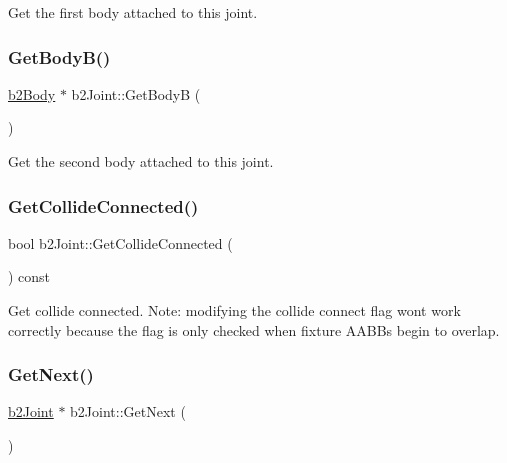 Get the first body attached to this joint. 

\mbox{\label{classb2_joint_a700b3d4c87f34f456151b9598e4641a0}} 
\subsubsection{\texorpdfstring{GetBodyB()}{GetBodyB()}}
{\footnotesize\ttfamily \mbox{\hyperlink{classb2_body}{b2\+Body}} $\ast$ b2\+Joint\+::\+Get\+BodyB (\begin{DoxyParamCaption}{ }\end{DoxyParamCaption})\hspace{0.3cm}{\ttfamily [inline]}}



Get the second body attached to this joint. 

\mbox{\label{classb2_joint_a48492903df96c8a7b8cad8ed826f8cb0}} 
\subsubsection{\texorpdfstring{GetCollideConnected()}{GetCollideConnected()}}
{\footnotesize\ttfamily bool b2\+Joint\+::\+Get\+Collide\+Connected (\begin{DoxyParamCaption}{ }\end{DoxyParamCaption}) const\hspace{0.3cm}{\ttfamily [inline]}}

Get collide connected. Note\+: modifying the collide connect flag won\textquotesingle{}t work correctly because the flag is only checked when fixture A\+A\+B\+Bs begin to overlap. \mbox{\label{classb2_joint_a1a0e2137b631010750c728cb4e276e5d}} 
\subsubsection{\texorpdfstring{GetNext()}{GetNext()}\hspace{0.1cm}{\footnotesize\ttfamily [1/2]}}
{\footnotesize\ttfamily \mbox{\hyperlink{classb2_joint}{b2\+Joint}} $\ast$ b2\+Joint\+::\+Get\+Next (\begin{DoxyParamCaption}{ }\end{DoxyParamCaption})\hspace{0.3cm}{\ttfamily [inline]}}



